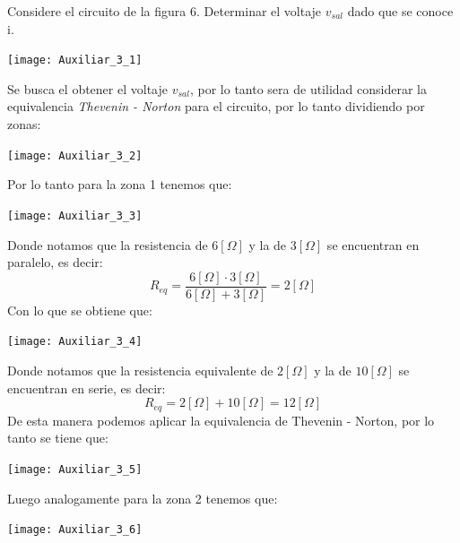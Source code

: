 \documentclass[
  11pt,
  letterpaper,
   addpoints,
   answers
  ]{exam}
\begin{document}
\begin{questions}
    \question     
    Considere el circuito de la figura 6. Determinar el voltaje $v_{sal}$ dado que se conoce i.
    \begin{center}
        \texttt{[image: Auxiliar\_3\_1]}
    \end{center}

    \begin{solution}
        Se busca el obtener el voltaje $v_{sal}$, por lo tanto sera de utilidad considerar la equivalencia \textit{Thevenin - Norton} para el circuito, por lo tanto dividiendo por zonas:
        \begin{center}
            \texttt{[image: Auxiliar\_3\_2]}
        \end{center}
        Por lo tanto para la zona 1 tenemos que:
        \begin{center}
            \texttt{[image: Auxiliar\_3\_3]}
        \end{center}
        Donde notamos que la resistencia de $6[\Omega]$ y la de $3[\Omega]$ se encuentran en paralelo, es decir:
        \begin{equation}
            R_{eq} = \frac{6[\Omega] \cdot 3[\Omega]}{6[\Omega] + 3[\Omega]} = 2[\Omega]
        \end{equation}
        Con lo que se obtiene que:
        \begin{center}
            \texttt{[image: Auxiliar\_3\_4]}
        \end{center}
        Donde notamos que la resistencia equivalente de $2[\Omega]$ y la de $10[\Omega]$ se encuentran en serie, es decir:
        \begin{equation}
            R_{eq} = 2[\Omega] + 10[\Omega] = 12[\Omega]
        \end{equation}
        De esta manera podemos aplicar la equivalencia de Thevenin - Norton, por lo tanto se tiene que:
        \begin{center}
            \texttt{[image: Auxiliar\_3\_5]}
        \end{center}
        Luego analogamente para la zona 2 tenemos que:
        \begin{center}
            \texttt{[image: Auxiliar\_3\_6]}

\end{center}
\end{solution}
\end{questions}
\end{document}
